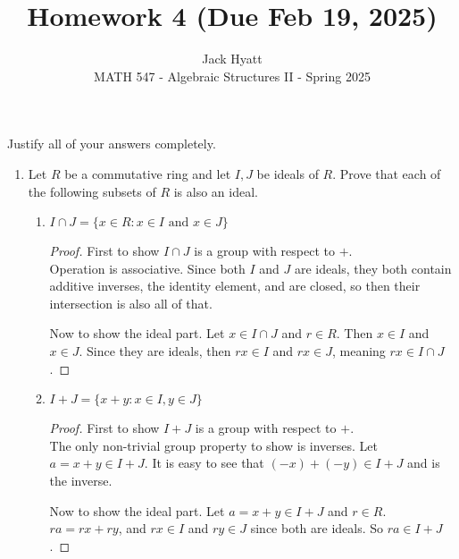 \documentclass[12pt]{article}
\begin{document}
	
	
	
	\title{Homework 4 (Due Feb 19, 2025)}
	\author{Jack Hyatt\\ %
		MATH 547 - Algebraic Structures II - Spring 2025} 
	
	\maketitle
	
	Justify all of your answers completely.\\
	
	
	\medskip 
	
	\begin{enumerate}
		\item Let $R$ be a commutative ring and let $I,J$ be ideals of $R$. Prove that each of the following subsets of $R$ is also an ideal.
		\begin{enumerate}
			\item $I \cap J = \{x \in R : x \in I \text{ and } x \in J\}$
			\begin{proof}
				First to show $I \cap J$ is a group with respect to $+$.\\
				Operation is associative. Since both $I$ and $J$ are ideals, they both contain additive inverses, the identity element, and are closed, so then their intersection is also all of that.
				
				Now to show the ideal part. Let $x \in I \cap J$ and $r \in R$. Then $x \in I$ and $x \in J$.  Since they are ideals, then $rx \in I$ and $rx \in J$, meaning $rx \in I \cap J$.
			\end{proof}
			
			
			\item $I + J = \{x+y : x \in I, y \in J\}$
			\begin{proof}
				First to show $I + J$ is a group with respect to $+$.\\
				The only non-trivial group property to show is inverses. Let $a = x+y \in I + J$. It is easy to see that $(-x) + (-y) \in I+J$ and is the inverse.
				
				Now to show the ideal part. Let $a=x+y \in I + J$ and $r \in R$. $ra = rx + ry$, and $rx \in I$ and $ry \in J$ since both are ideals. So $ra \in I+J$.
			\end{proof}
			

\end{enumerate}
\end{enumerate}
\end{document}
